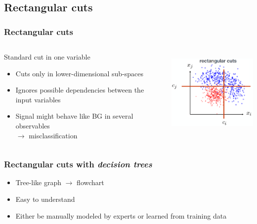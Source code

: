\documentclass{beamer}
\begin{document}
\subsection{Rectangular cuts} %
\begin{frame}
    \frametitle{Rectangular cuts}
    \begin{columns}[T] %
        \begin{column}{.48\textwidth}
            \vspace*{-10mm}
            Standard cut in one variable
            \begin{itemize}
                \item<1-> Cuts only in lower-dimensional sub-spaces
                \item<2-> Ignores possible dependencies between the input variables
                \item<3-> Signal might behave like BG in several observables\\ $\to$ misclassification
            \end{itemize}
        \end{column}%
        \hfill%
        \begin{column}{.48\textwidth}
            \vspace*{-10mm}
            \raggedright\includegraphics[height=4.3cm,keepaspectratio]{pics/mva_cuts_rectangular.png}%
            
        \end{column}%
    \end{columns}

\end{frame}


\begin{frame}
    \frametitle{Rectangular cuts with \emph{decision trees}}
    \vspace*{-7mm}
    \begin{itemize}
        \item Tree-like graph $\to$ flowchart
        \item Easy to understand
        \item Either be manually modeled by experts or learned from training data
    \end{itemize}
\end{frame}
\end{document}
